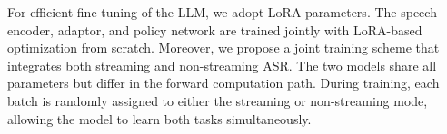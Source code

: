 \documentclass{article}
\begin{document}
For efficient fine-tuning of the LLM, we adopt LoRA parameters.
The speech encoder, adaptor, and policy network are trained jointly with LoRA-based optimization from scratch.
Moreover, we propose a joint training scheme that integrates both streaming and non-streaming ASR.
The two models share all parameters but differ in the forward computation path.
During training, each batch is randomly assigned to either the streaming or non-streaming mode, allowing the model to learn both tasks simultaneously.




\end{document}
